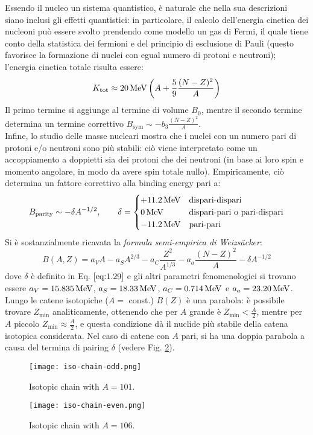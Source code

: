 Essendo il nucleo un sistema quantistico, è naturale che nella sua descrizioni siano inclusi gli effetti quantistici: in particolare, il calcolo dell'energia cinetica dei nucleoni può essere svolto prendendo come modello un gas di Fermi, il quale tiene conto della statistica dei fermioni e del principio di esclusione di Pauli (questo favorisce la formazione di nuclei con egual numero di protoni e neutroni); l'energia cinetica totale risulta essere:
\begin{equation}
	K_{\text{tot}} \approx 20 \,\text{MeV} \left( A + \frac{5}{9} \frac{(N - Z)^2}{A} \right)
	\label{eq:1.28}
\end{equation}
Il primo termine si aggiunge al termine di volume $ B_0 $, mentre il secondo termine determina un termine correttivo $ B_{\text{sym}} \sim - b_3 \frac{(N - Z)^2}{A} $.\\
Infine, lo studio delle masse nucleari mostra che i nuclei con un numero pari di protoni e/o neutroni sono più stabili: ciò viene interpretato come un accoppiamento a doppietti sia dei protoni che dei neutroni (in base ai loro spin e momento angolare, in modo da avere spin totale nullo). Empiricamente, ciò determina un fattore correttivo alla binding energy pari a:
\begin{equation}
	B_{\text{parity}} \sim - \delta A^{-1/2}, \qquad \delta =
	\begin{cases}
		+11.2\,\text{MeV} & \text{dispari-dispari} \\
		0\,\text{MeV} & \text{dispari-pari o pari-dispari} \\
		-11.2\,\text{MeV} & \text{pari-pari}
	\end{cases}
	\label{eq:1.29}
\end{equation}
Si è sostanzialmente ricavata la \textit{formula semi-empirica di Weizsäcker}:
\begin{equation}
	B(A,Z) = a_V A - a_S A^{2/3} - a_C \frac{Z^2}{A^{1/3}} - a_a \frac{(N - Z)^2}{A} - \delta A^{-1/2}
	\label{eq:1.30}
\end{equation}
dove $ \delta $ è definito in Eq. $ \ref{eq:1.29} $ e gli altri parametri fenomenologici si trovano essere $ a_V = 15.835\,\text{MeV} $, $ a_S = 18.33\,\text{MeV} $, $ a_C = 0.714\,\text{MeV} $ e $ a_a = 23.20\,\text{MeV} $.\\
Lungo le catene isotopiche ($ A = $ const.) $ B(Z) $ è una parabola: è possibile trovare $ Z_{\text{min}} $ analiticamente, ottenendo che per $ A $ grande è $ Z_{\text{min}} < \frac{A}{2} $, mentre per $ A $ piccolo $ Z_{\text{min}} \approx \frac{A}{2} $, e questa condizione dà il nuclide più stabile della catena isotopica considerata. Nel caso di catene con $ A $ pari, si ha una doppia parabola a causa del termina di pairing $ \delta $ (vedere Fig. \ref{iso-chain-even}).
\begin{figure}
	\centering
	\texttt{[image: iso-chain-odd.png]}
	\caption{Isotopic chain with $ A = 101 $.}
	\label{iso-chain-odd}
\end{figure}
\begin{figure}
	\centering
	\texttt{[image: iso-chain-even.png]}
	\caption{Isotopic chain with $ A = 106 $.}
	\label{iso-chain-even}
\end{figure}

